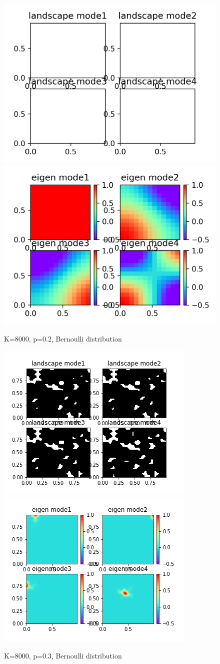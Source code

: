 \documentclass[UTF8,12pt]{article}
\begin{document}
\begin{figure}[htbp]
    \centering
    \includegraphics[width=0.45\linewidth]{../pics/wm13}
    \includegraphics[width=0.45\linewidth]{../pics/u13}
    \caption{K=8000, p=0.2, Bernoulli distribution}
    \label{fig13}
\end{figure}

\begin{figure}[htbp]
    \centering
    \includegraphics[width=0.45\linewidth]{../pics/wm11}
    \includegraphics[width=0.45\linewidth]{../pics/u11}
    \caption{K=8000, p=0.3, Bernoulli distribution}
    \label{fig14}
\end{figure}
\end{document}
